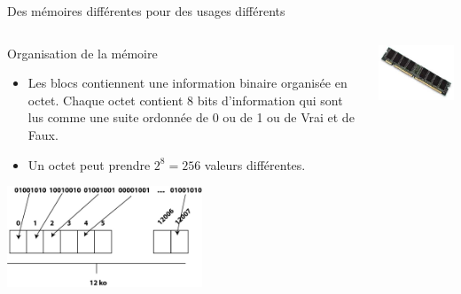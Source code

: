 \begin{frame}{Des mémoires différentes pour des usages différents}
\begin{columns}
{\begin{column}{.65\linewidth}
\begin{block}{Organisation de la mémoire}
\begin{itemize}
          \item Les blocs contiennent une information binaire organisée
            en octet. Chaque octet contient 8 bits d'information qui
            sont lus comme une suite ordonnée de 0 ou de 1 ou de Vrai et
            de Faux.
          \item Un octet peut prendre $2^8=256$ valeurs différentes.
          \end{itemize}
        \end{block}
        \centerline{\includegraphics[height=3cm]{img/s01/Memoire.jpg}}
      \end{column}
    }%
    \begin{column}{.3\linewidth}
      \includegraphics[width=\linewidth]{img/s01/RAM.png}\\
      \vspace{1cm}

\end{column}
\end{columns}
\end{frame}
